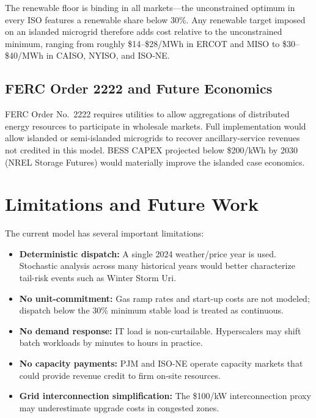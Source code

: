 \documentclass[conference]{IEEEtran}
\begin{document}
The renewable floor is binding in all markets---the unconstrained optimum in
every ISO features a renewable share below 30\%.
Any renewable target imposed on an islanded microgrid therefore adds cost
relative to the unconstrained minimum, ranging from roughly \$14--\$28/MWh
in ERCOT and MISO to \$30--\$40/MWh in CAISO, NYISO, and ISO-NE.

\subsection{FERC Order 2222 and Future Economics}

FERC Order No.\ 2222 requires utilities to allow aggregations of distributed
energy resources to participate in wholesale markets.
Full implementation would allow islanded or semi-islanded microgrids to
recover ancillary-service revenues not credited in this model.
BESS CAPEX projected below \$200/kWh by 2030 (NREL Storage Futures) would
materially improve the islanded case economics.

\section{Limitations and Future Work}
\label{sec:limitations}

The current model has several important limitations:

\begin{itemize}
\item \textbf{Deterministic dispatch:} A single 2024 weather/price year is
used.
Stochastic analysis across many historical years would better characterize
tail-risk events such as Winter Storm Uri.

\item \textbf{No unit-commitment:} Gas ramp rates and start-up costs are not
modeled; dispatch below the 30\% minimum stable load is treated as
continuous.

\item \textbf{No demand response:} IT load is non-curtailable.
Hyperscalers may shift batch workloads by minutes to hours in practice.

\item \textbf{No capacity payments:} PJM and ISO-NE operate capacity markets
that could provide revenue credit to firm on-site resources.

\item \textbf{Grid interconnection simplification:} The \$100/kW
interconnection proxy may underestimate upgrade costs in congested zones.
\end{itemize}
\end{document}
